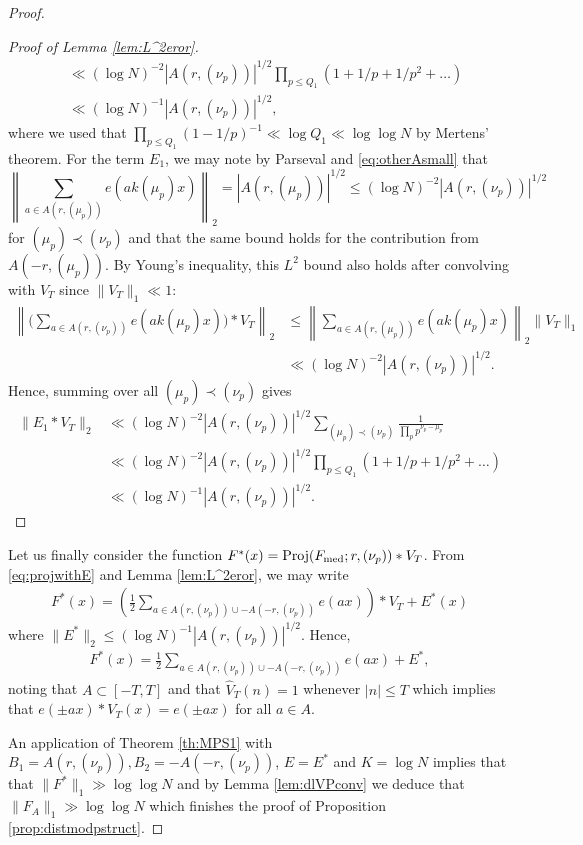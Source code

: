 \documentclass[11pt, reqno]{amsart}
\DeclareMathOperator{\Proj}{Proj}
\begin{document}
\begin{proof}
\begin{proof}[Proof of Lemma \ref{lem:L^2eror}]
\begin{align*}
       &\ll (\log N)^{-2}|A(r,(\nu_p))|^{1/2}\prod_{p\leqslant Q_1}(1+1/p+1/p^2+\dots)\\
       &\ll (\log N)^{-1}|A(r,(\nu_p))|^{1/2},
   \end{align*}
   where we used that $\prod_{p\leqslant Q_1}(1-1/p)^{-1}\ll \log Q_1\ll \log\log N$ by Mertens' theorem. For the term $E_1$, we may note by Parseval and \eqref{eq:otherAsmall} that $$\left\lVert \sum_{a\in A(r,(\mu_p))}e(ak(\mu_p)x)\right\rVert_2=|A(r,(\mu_p))|^{1/2}\leqslant (\log N)^{-2}|A(r,(\nu_p))|^{1/2}$$ for $(\mu_p)\prec (\nu_p)$ and that the same bound holds for the contribution from $A(-r,(\mu_p))$. By Young's inequality, this $L^2$ bound also holds after convolving with $V_{T}$ since $\lVert V_{T}\rVert_1\ll 1$:
   \begin{align*}
       \left\lVert \Big(\sum_{a\in A(r,(\nu_p))}e(ak(\mu_p)x)\Big)*V_{T}\right\rVert_2&\leqslant \left\lVert\sum_{a\in A(r,(\mu_p))}e(ak(\mu_p)x)\right\rVert_2\lVert V_{T}\rVert_1\\
       &\ll (\log N)^{-2}|A(r,(\nu_p))|^{1/2}.
   \end{align*} Hence, summing over all $(\mu_p)\prec(\nu_p)$ gives
\begin{align*}
\lVert E_1*V_{T}\rVert_2&\ll (\log N)^{-2}|A(r,(\nu_p))|^{1/2}\sum_{(\mu_p)\prec(\nu_p)}\frac{1}{\prod_p p^{\nu_p-\mu_p}}\\
&\ll (\log N)^{-2}|A(r,(\nu_p))|^{1/2}\prod_{p\leqslant Q_1}(1+1/p+1/p^2+\dots)\\
&\ll (\log N)^{-1}|A(r,(\nu_p))|^{1/2}.
   \end{align*}
\end{proof}


\medskip

Let us finally consider the function $F^*(x)=\Proj(F_\textnormal{med};r,(\nu_p))*V_{T}$. From \eqref{eq:projwithE} and Lemma \ref{lem:L^2eror}, we may write
\begin{align*}
    F^*(x)=\left(\frac{1}{2}\sum_{a\in A(r,(\nu_p))\cup-A(-r,(\nu_p))}e(ax)\right)*V_{T}+E^*(x)
\end{align*}
where $\lVert E^*\rVert_2\leqslant (\log N)^{-1}|A(r,(\nu_p))|^{1/2}$. Hence,
\begin{align*}
    F^*(x) = \frac{1}{2}\sum_{a\in A(r,(\nu_p))\cup-A(-r,(\nu_p))}e(ax)+E^*,
\end{align*}
noting that $A\subset [-T,T]$ and that $\hat{V}_T(n)=1$ whenever $|n|\leqslant T$ which implies that $e(\pm ax)*V_T(x)=e(\pm ax)$ for all $a\in A$.

\medskip

An application of Theorem \ref{th:MPS1} with $B_1=A(r,(\nu_p)), B_2=-A(-r,(\nu_p))$, $E=E^*$ and $K=\log N$ implies that that $\lVert F^*\rVert_1\gg \log\log N$ and by Lemma \ref{lem:dlVPconv} we deduce that $\lVert F_A\rVert_1\gg \log \log N$ which finishes the proof of Proposition \ref{prop:distmodpstruct}.
\end{proof}
\end{document}
